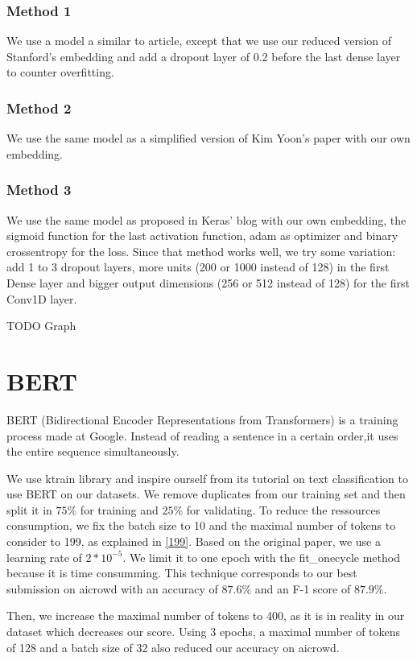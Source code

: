 \documentclass[11pt, a4paper, twocolumn]{article}
\begin{document}
\subsubsection{Method 1}
We use a model a similar to article\cite{cnn1}, except that we use our reduced version of Stanford's embedding and add a dropout layer of 0.2 before the last dense layer to counter overfitting.

\subsubsection{Method 2}
We use the same model as a simplified version\cite{cnn2} of Kim Yoon's paper\cite{kimyoonpaper} with our own embedding.

\subsubsection{Method 3}
We use the same model as proposed in Keras' blog\cite{cnn3} with our own embedding, the sigmoid function for the last activation function, adam as optimizer and binary crossentropy for the loss.
Since that method works well, we try some variation: add 1 to 3 dropout layers, more units (200 or 1000 instead of 128) in the first Dense layer and bigger output dimensions (256 or 512 instead of 128) for the first Conv1D layer.

TODO Graph

\section{BERT}
BERT (Bidirectional Encoder Representations from Transformers)\cite{bertpaper} is a training process made at Google. Instead of reading a sentence in a certain order,it uses the entire sequence simultaneously.

We use ktrain library\cite{ktrain} and inspire ourself from its tutorial on text classification to use BERT on our datasets. We remove duplicates from our training set and then split it in $75\%$ for training and $25\%$ for validating. To reduce the ressources consumption, we fix the batch size to 10 and the maximal number of tokens to consider to 199, as explained in \ref{199}. Based on the original paper, we use a learning rate of $2*10^{-5}$. We limit it to one epoch with the fit\_onecycle method because it is time consumming. This technique corresponds to our best submission on aicrowd with an accuracy of $87.6\%$ and an F-1 score of $87.9\%$.

Then, we  increase the maximal number of tokens to 400, as it is in reality in our dataset which decreases our score. Using 3 epochs, a maximal number of tokens of 128 and a batch size of 32 also reduced our accuracy on aicrowd.
\end{document}
